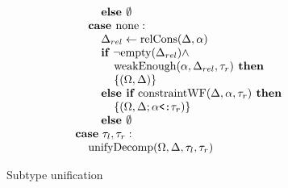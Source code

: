 \documentclass[acmsmall]{acmart}
\begin{document}
\begin{figure*}[h]
\[\begin{array}[t]{@{} l}
  \\
  \I\I\I \B{else } \emptyset 
  \\
  \I\I \B{case } \F{none} :
  \\
  \I\I\I \Delta_{rel} \leftarrow \F{relCons}(\Delta, \alpha)  
  \\
  \I\I\I \B{if } \neg \F{empty}(\Delta_{rel}) \wedge 
  \\
  \I\I\I\I \F{weakEnough}(\alpha, \Delta_{rel}, \tau_r) \B{ then }
  \\
  \I\I\I\I \{(\Omega, \Delta)\}
  \\
  \I\I\I \B{else if } \F{constraintWF}(\Delta, \alpha, \tau_r) \B{ then }
  \\
  \I\I\I\I \{(\Omega, \Delta;\code{$\alpha$<:$\tau_r$})\}
  \\
  \I\I\I \B{else } \emptyset 

  \\

  \I \B{case}\ \tau_{l}, \tau_{r}:
  \\
  \I\I \F{unifyDecomp}(\Omega, \Delta, \tau_{l}, \tau_{r})
\end{array}
\]

\caption{Subtype unification}
\label{fig:unify}
\end{figure*}
\end{document}
